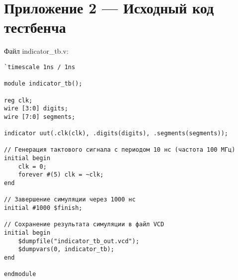 \chapter{Приложение 2 --- Исходный код тестбенча}

Файл indicator\_tb.v:
\begingroup
    \fontsize{12pt}{12pt}\selectfont
    \linespread{1.5}
    \begin{verbatim}
`timescale 1ns / 1ns

module indicator_tb();

reg clk;
wire [3:0] digits;
wire [7:0] segments;

indicator uut(.clk(clk), .digits(digits), .segments(segments));

// Генерация тактового сигнала с периодом 10 нс (частота 100 МГц)
initial begin
    clk = 0;
    forever #(5) clk = ~clk;
end

// Завершение симуляции через 1000 нс
initial #1000 $finish;

// Сохранение результата симуляции в файл VCD
initial begin
    $dumpfile("indicator_tb_out.vcd");
    $dumpvars(0, indicator_tb);
end

endmodule
    \end{verbatim}  
\endgroup
\endinput
